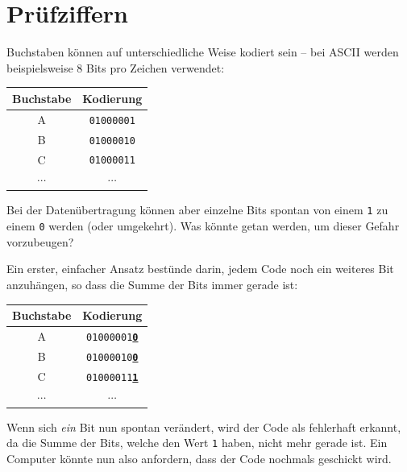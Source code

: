 \section{Prüfziffern}

Buchstaben können auf unterschiedliche Weise kodiert sein -- bei \gls{ASCII} werden beispielsweise 8 Bits pro Zeichen verwendet:

\begin{table}[H]
	\centering
	\begin{tabular}{c|c}
		Buchstabe  & Kodierung         \\\midrule\midrule
		A          & \texttt{01000001} \\\midrule
		B          & \texttt{01000010} \\\midrule
		C          & \texttt{01000011} \\\midrule
		\(\cdots\) & \(\cdots\)
	\end{tabular}
\end{table}
Bei der Datenübertragung können aber einzelne Bits spontan von einem \texttt{1} zu einem \texttt{0} werden (oder umgekehrt). Was könnte getan werden, um dieser Gefahr vorzubeugen?

Ein erster, einfacher Ansatz bestünde darin, jedem Code noch ein weiteres Bit anzuhängen, so dass die Summe der Bits immer gerade ist:

\begin{table}[H]
	\centering
	\begin{tabular}{c|c}
		Buchstabe  & Kodierung                               \\\midrule\midrule
		A          & \texttt{01000001\underline{\textbf{0}}} \\\midrule
		B          & \texttt{01000010\underline{\textbf{0}}} \\\midrule
		C          & \texttt{01000011\underline{\textbf{1}}} \\\midrule
		\(\cdots\) & \(\cdots\)
	\end{tabular}
\end{table}

Wenn sich \textit{ein} Bit nun spontan verändert, wird der Code als fehlerhaft erkannt, da die Summe der Bits, welche den Wert \texttt{1} haben, nicht mehr gerade ist. Ein Computer könnte nun also anfordern, dass der Code nochmals geschickt wird.

